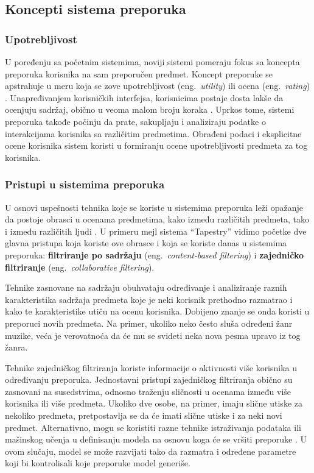 \documentclass[a4paper]{article}
\begin{document}
\subsection{Koncepti sistema preporuka}
\label{subsec:koncepti_sistema_preporuka}

\subsubsection{Upotrebljivost}
\label{subsubsec:upotrebljivost}

U poređenju sa početnim sistemima, noviji sistemi pomeraju fokus sa koncepta preporuka korisnika na sam preporučen predmet. Koncept preporuke se apstrahuje u meru koja se zove upotrebljivost (eng.~{\em utility}) ili ocena (eng.~{\em rating}) \cite{burke_recommender_2011}. Unapređivanjem korisničkih interfejsa, korisnicima postaje dosta lakše da ocenjuju sadržaj, obično u veoma malom broju koraka \cite{aggarwal_recommender_2016}. Uprkos tome, sistemi preporuka takođe počinju da prate, sakupljaju i analiziraju podatke o interakcijama korisnika sa različitim predmetima. Obrađeni podaci i eksplicitne ocene korisnika sistem koristi u formiranju ocene upotrebljivosti predmeta za tog korisnika.

\subsubsection{Pristupi u sistemima preporuka}
\label{subsubsec:pristupi_sistema_preporuka}

U osnovi uspešnosti tehnika koje se koriste u sistemima preporuka leži opažanje da postoje obrasci u ocenama predmetima, kako između različitih predmeta, tako i između različitih ljudi \cite{aggarwal_recommender_2016}. U primeru mejl sistema ``Tapestry'' vidimo početke dve glavna pristupa koja koriste ove obrasce i koja se koriste danas u sistemima preporuka: \textbf{filtriranje po sadržaju} (eng.~{\em content-based filtering}) i \textbf{zajedničko filtriranje} (eng.~{\em collaborative filtering}).

Tehnike zasnovane na sadržaju obuhvataju određivanje i analiziranje raznih karakteristika sadržaja predmeta koje je neki korisnik prethodno razmatrao i kako te karakteristike utiču na ocenu korisnika. Dobijeno znanje se onda koristi u preporuci novih predmeta. Na primer, ukoliko neko često sluša određeni žanr muzike, veća je verovatnoća da će mu se svideti neka nova pesma upravo iz tog žanra.

Tehnike zajedničkog filtriranja koriste informacije o aktivnosti više korisnika u određivanju preporuka. Jednostavni pristupi zajedničkog filtriranja obično su zasnovani na susedstvima, odnosno traženju sličnosti u ocenama između više korisnika ili više predmeta. Ukoliko dve osobe, na primer,  imaju slične utiske za nekoliko predmeta, pretpostavlja se da će imati slične utiske i za neki novi predmet. Alternativno, mogu se koristiti razne tehnike istraživanja podataka ili mašinskog učenja u definisanju modela na osnovu koga će se vršiti preporuke \cite{aggarwal_recommender_2016}. U ovom slučaju, model se može razvijati tako da razmatra i određene parametre koji bi kontrolisali koje preporuke model generiše.
\end{document}
